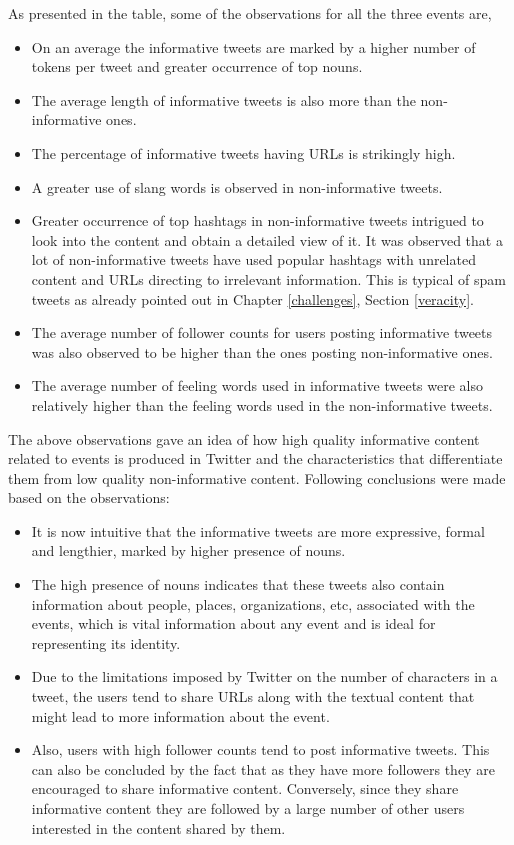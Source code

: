 As presented in the table, some of the observations for all the three events are, 

\begin{itemize}
\item On an average the informative tweets are marked by a higher number of tokens per tweet and greater occurrence of top nouns. 
\item The average length of informative tweets is also more than the non-informative ones. 
\item The percentage of informative tweets having URLs is strikingly high. 
\item A greater use of slang words is observed in non-informative tweets. 
\item Greater occurrence of top hashtags in non-informative tweets intrigued to look into the content and obtain a detailed view of it. It was observed that a lot of non-informative tweets have used popular hashtags with unrelated content and URLs directing to irrelevant information. This is typical of spam tweets as already pointed out in Chapter \ref{challenges}, Section \ref{veracity}. 
\item The average number of follower counts for users posting informative tweets was also observed to be higher than the ones posting non-informative ones. 
\item The average number of feeling words used in informative tweets were also relatively higher than the feeling words used in the non-informative tweets. 
\end{itemize}

The above observations gave an idea of how high quality informative content related to events is produced in Twitter and the characteristics that differentiate them from low quality non-informative content. Following conclusions were made based on the observations:
\begin{itemize}
\item It is now intuitive that the informative tweets are more expressive, formal and lengthier, marked by higher presence of nouns. 
\item The high presence of nouns indicates that these tweets also contain information about people, places, organizations, etc, associated with the events, which is vital information about any event and is ideal for representing its identity. 
\item Due to the limitations imposed by Twitter on the number of characters in a tweet, the users tend to share URLs along with the textual content that might lead to more information about the event. 
\item Also, users with high follower counts tend to post informative tweets. This can also be concluded by the fact that as they have more followers they are encouraged to share informative content. Conversely, since they share informative content they are followed by a large number of other users interested in the content shared by them.
\end{itemize}

